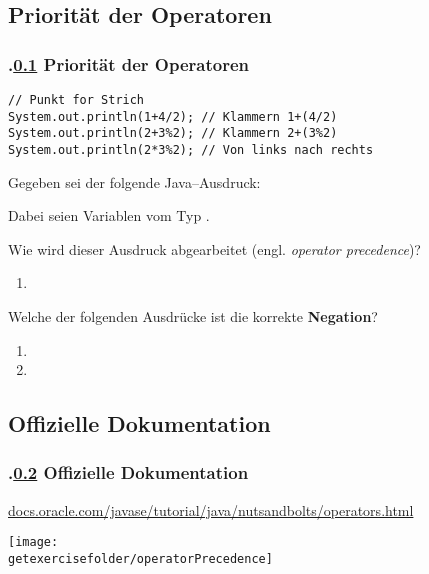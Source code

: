 \def\sstitle{Priorität der Operatoren}
\subsection{\sstitle}\label{S:Prioritat}
\begin{frame}[fragile]
  \frametitle{\kap.\ref{S:Prioritat} \sstitle}%

\begin{lstlisting}[style=java, frame=single]
// Punkt for Strich
System.out.println(1+4/2); // Klammern 1+(4/2)
System.out.println(2+3%2); // Klammern 2+(3%2)
System.out.println(2*3%2); // Von links nach rechts
\end{lstlisting}
\hfill

Gegeben sei der folgende Java--Ausdruck:
\begin{center}
\end{center}
Dabei seien  Variablen vom Typ .
\medskip

Wie wird dieser Ausdruck abgearbeitet (engl. \emph{operator precedence})?
\pause
\begin{enumerate}
  \item {}
\end{enumerate}
\pause
Welche der folgenden Ausdrücke ist die korrekte \textbf{Negation}?
\begin{enumerate}
  \item {}
  \item {}
\end{enumerate}

\end{frame}

\def\stitle{Offizielle Dokumentation}
\subsection{\stitle}\label{S:Dokumentation}
\begin{frame}[fragile]%
  \frametitle{\kap.\ref{S:Dokumentation} \stitle}%
\textcolor{KITblue}{\url{docs.oracle.com/javase/tutorial/java/nutsandbolts/operators.html}}

\begin{center}
\texttt{[image: \\getexercisefolder/operatorPrecedence]}
\end{center}
\end{frame}
